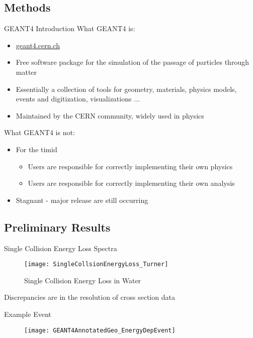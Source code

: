 \subsection{Methods}
\begin{frame}[fragile]{GEANT4 Introduction}
What GEANT4 is:
\begin{itemize}
  \small
  \item \href{geant4.cern.ch}{geant4.cern.ch}
  \item Free software package for the simulation of the passage of particles through matter
  \item Essentially a collection of tools for geometry, materials, physics models, events and digitization, visualizations $\dots$
  \item Maintained by the CERN community, widely used in physics
\end{itemize}
What GEANT4 is not:
\begin{itemize}
  \small
  \item For the timid
  \begin{itemize}
    \item Users are responsible for correctly implementing their own physics
    \item Users are responsible for correctly implementing their own analysis
  \end{itemize}
  \item Stagnant - major release are still occurring
\end{itemize}
\end{frame}
\subsection{Preliminary Results}
\begin{frame}{Single Collision Energy Loss Spectra}
  \begin{figure}
    \texttt{[image: SingleCollsionEnergyLoss\_Turner]}
    \caption{Single Collision Energy Loss in Water\cite{turner_comparative_1982}}
  \end{figure}
\vspace{2mm}
Discrepancies are in the resolution of cross section data
\end{frame}
\begin{frame}{Example Event}
  \begin{figure}
    \texttt{[image: GEANT4AnnotatedGeo\_EnergyDepEvent]}
  \end{figure}
\end{frame}
